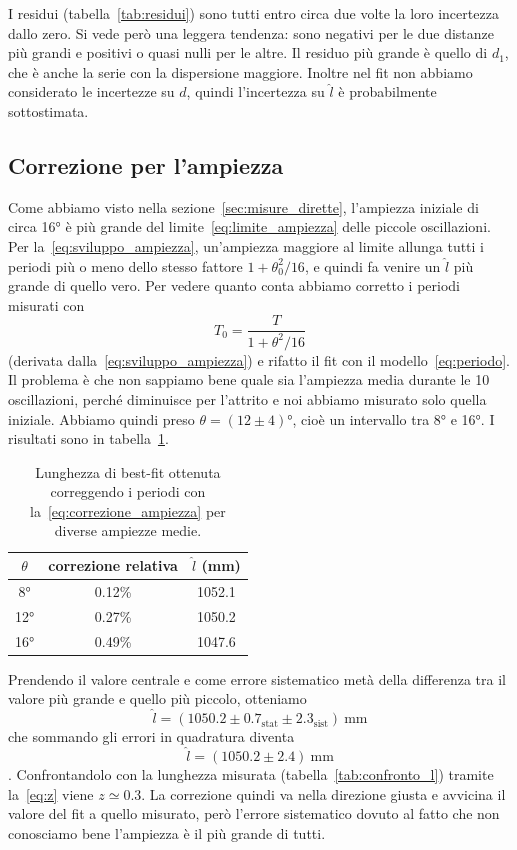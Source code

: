 \documentclass[a4paper]{article}
\begin{document}
I residui (tabella~\ref{tab:residui}) sono tutti entro circa due volte la loro incertezza dallo zero. Si vede però una leggera tendenza: sono negativi per le due distanze più grandi e positivi o quasi nulli per le altre. Il residuo più grande è quello di $d_1$, che è anche la serie con la dispersione maggiore. Inoltre nel fit non abbiamo considerato le incertezze su $d$, quindi l'incertezza su $\hat{l}$ è probabilmente sottostimata.

\subsection{Correzione per l'ampiezza}\label{sec:ampiezza}
Come abbiamo visto nella sezione~\ref{sec:misure_dirette}, l'ampiezza iniziale di circa 16° è più grande del limite~\eqref{eq:limite_ampiezza} delle piccole oscillazioni. Per la~\eqref{eq:sviluppo_ampiezza}, un'ampiezza maggiore al limite allunga tutti i periodi più o meno dello stesso fattore $1 + \theta_0^2/16$, e quindi fa venire un $\hat{l}$ più grande di quello vero. Per vedere quanto conta abbiamo corretto i periodi misurati con
\begin{equation}
    T_0 = \frac{T}{1 + \theta^2/16}
    \label{eq:correzione_ampiezza}
\end{equation}
(derivata dalla~\eqref{eq:sviluppo_ampiezza}) e rifatto il fit con il modello~\eqref{eq:periodo}. Il problema è che non sappiamo bene quale sia l'ampiezza media durante le 10 oscillazioni, perché diminuisce per l'attrito e noi abbiamo misurato solo quella iniziale. Abbiamo quindi preso $\theta = (12 \pm 4)$°, cioè un intervallo tra 8° e 16°. I risultati sono in tabella~\ref{tab:ampiezza}.

\begin{table}[H]
    \centering
    \begin{tabular}{c|c|c}
      $\theta$ & correzione relativa & $\hat{l}$ (mm)\\
      \hline
      8° & 0.12\% & 1052.1 \\
      12° & 0.27\% & 1050.2 \\
      16° & 0.49\% & 1047.6 \\
    \end{tabular}
    \caption{Lunghezza di best-fit ottenuta correggendo i periodi con la~\eqref{eq:correzione_ampiezza} per diverse ampiezze medie.}
    \label{tab:ampiezza}
\end{table}

Prendendo il valore centrale e come errore sistematico metà della differenza tra il valore più grande e quello più piccolo, otteniamo
\begin{equation}
    \hat{l} = (1050.2 \pm 0.7_{\mathrm{stat}} \pm 2.3_{\mathrm{sist}})\ \text{mm}
    \label{eq:l_corretto}
\end{equation}
che sommando gli errori in quadratura diventa $$\hat{l} = (1050.2 \pm 2.4)~\text{mm}$$. Confrontandolo con la lunghezza misurata (tabella~\ref{tab:confronto_l}) tramite la~\eqref{eq:z} viene $z \simeq 0.3$. La correzione quindi va nella direzione giusta e avvicina il valore del fit a quello misurato, però l'errore sistematico dovuto al fatto che non conosciamo bene l'ampiezza è il più grande di tutti.
\end{document}

